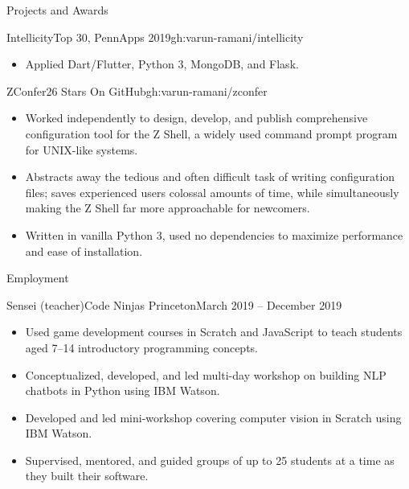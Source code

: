 \documentclass[]{mcdowellcv}
\begin{document}
\begin{cvsection}{Projects and Awards}
\begin{cvsubsection}{Intellicity}{Top 30, PennApps 2019}{gh:varun-ramani/intellicity}
\begin{itemize}
				\item Applied Dart/Flutter, Python 3, MongoDB, and Flask.
			\end{itemize}
		\end{cvsubsection}
		\begin{cvsubsection}{ZConfer}{26 Stars On GitHub}{gh:varun-ramani/zconfer}
			\begin{itemize}
				\item Worked independently to design, develop, and publish comprehensive configuration tool
				for the Z Shell, a widely used command prompt program for UNIX-like systems.
				\item Abstracts away the tedious and often difficult task of writing configuration files;
				saves experienced users colossal amounts of time, while simultaneously making the Z Shell far
				more approachable for newcomers.
				\item Written in vanilla Python 3, used no dependencies to maximize performance and ease 
				of installation.
			\end{itemize}
		\end{cvsubsection}
	\end{cvsection}

	\begin{cvsection}{Employment}
		\begin{cvsubsection}{Sensei (teacher)}{Code Ninjas Princeton}{March 2019 -- December 2019}
			\begin{itemize}
				\item Used game development courses in Scratch and JavaScript to 
				teach students aged 7--14 introductory programming concepts.
				\item Conceptualized, developed, and led multi-day workshop on building NLP chatbots in 
				Python using IBM Watson.
				\item Developed and led mini-workshop covering computer vision in Scratch using IBM Watson.
				\item Supervised, mentored, and guided groups of up to 25 students at a time as they 
				built their software.
			\end{itemize}
		\end{cvsubsection}
	\end{cvsection}
\end{document}
